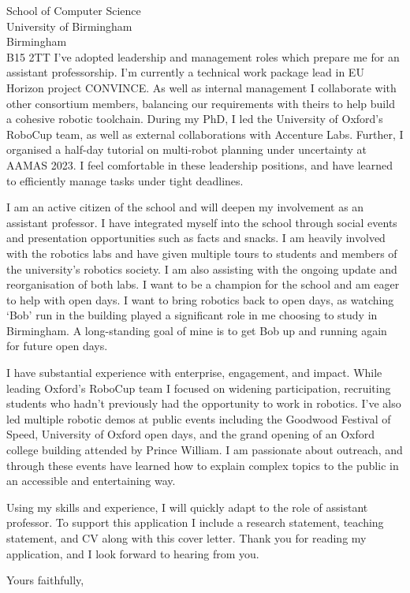 \documentclass[12pt]{letter}
\begin{document}
\begin{letter}{School of Computer Science \\ University of Birmingham \\ Birmingham \\ B15 2TT}
I've adopted leadership and management roles which prepare me for an assistant professorship.
%
I'm currently a technical work package lead in EU Horizon project CONVINCE.
%
As well as internal management I collaborate with other consortium members, balancing our requirements with theirs to help build a cohesive robotic toolchain.
%
During my PhD, I led the University of Oxford's RoboCup team, as well as external collaborations with Accenture Labs.
%
Further, I organised a half-day tutorial on multi-robot planning under uncertainty at AAMAS 2023.
%
I feel comfortable in these leadership positions, and have learned to efficiently manage tasks under tight deadlines.

I am an active citizen of the school and will deepen my involvement as an assistant professor.
%
I have integrated myself into the school through social events and presentation opportunities such as facts and snacks.
%
I am heavily involved with the robotics labs and have given multiple tours to students and members of the university's robotics society.
%
I am also assisting with the ongoing update and reorganisation of both labs.
%
I want to be a champion for the school and am eager to help with open days.
%
I want to bring robotics back to open days, as watching `Bob' run in the building played a significant role in me choosing to study in Birmingham.
%
A long-standing goal of mine is to get Bob up and running again for future open days.


I have substantial experience with enterprise, engagement, and impact.
%
While leading Oxford's RoboCup team I focused on widening participation, recruiting students who hadn't previously had the opportunity to work in robotics.
%
I've also led multiple robotic demos at public events including the Goodwood Festival of Speed, University of Oxford open days, and the grand opening of an Oxford college building attended by Prince William.
%
I am passionate about outreach, and through these events have learned how to explain complex topics to the public in an accessible and entertaining way.


Using my skills and experience, I will quickly adapt to the role of assistant professor.
%
To support this application I include a research statement, teaching statement, and CV along with this cover letter.
%
Thank you for reading my application, and I look forward to hearing from you.

\closing{\vspace{30pt} Yours faithfully,}
\end{letter}
\end{document}
